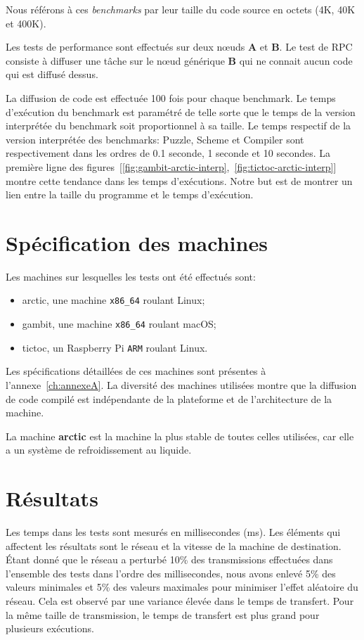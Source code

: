Nous référons à ces \textit{benchmarks} par leur taille du code source
en octets (4K, 40K et 400K).

Les tests de performance sont effectués sur deux nœuds \textbf{A}
et \textbf{B}. Le test de RPC consiste à diffuser une tâche
sur le nœud générique \textbf{B} qui ne connait aucun
code qui est diffusé dessus.

La diffusion de code est effectuée 100 fois pour chaque benchmark. Le temps
d'exécution du benchmark est paramétré de telle sorte que le temps de la
version interprétée du benchmark soit proportionnel à sa taille. Le temps
respectif de la version interprétée des benchmarks: Puzzle, Scheme et Compiler
sont respectivement dans les ordres de 0.1 seconde, 1 seconde et 10 secondes.
La première ligne des
figures~[\ref{fig:gambit-arctic-interp},~\ref{fig:tictoc-arctic-interp}] montre
cette tendance dans les temps d'exécutions. Notre but est de montrer un lien
entre la taille du programme et le temps d'exécution.

\section{Spécification des machines}
Les machines sur lesquelles les tests ont été effectués sont:
\begin{itemize}
  \item arctic, une machine \texttt{x86\_64} roulant Linux;
  \item gambit, une machine \texttt{x86\_64} roulant macOS;
  \item tictoc, un Raspberry Pi \texttt{ARM} roulant Linux.
\end{itemize}

Les spécifications détaillées de ces machines sont présentes à
l'annexe~\ref{ch:annexeA}. La diversité des machines utilisées montre que la
diffusion de code compilé est indépendante de la plateforme et de l'architecture de la
machine.

La machine \textbf{arctic} est la machine la plus stable de toutes
celles utilisées, car elle a un système de refroidissement au liquide.

\section{Résultats}

Les temps dans les tests sont mesurés en millisecondes (ms).  Les éléments qui
affectent les résultats sont le réseau et la vitesse de la machine de
destination. Étant donné que le réseau a perturbé 10\% des transmissions
effectuées dans l'ensemble des tests dans l'ordre des millisecondes, nous avons
enlevé 5\% des valeurs minimales et 5\% des valeurs maximales pour minimiser
l'effet aléatoire du réseau.  Cela est observé par une variance élevée dans le
temps de transfert.  Pour la même taille de transmission, le temps de transfert
est plus grand pour plusieurs exécutions.


